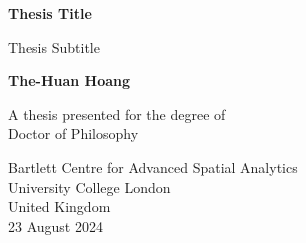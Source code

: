 \begin{titlepage}
    \begin{center}
        \vspace*{1cm}
 
        \textbf{Thesis Title}
 
        \vspace{0.5cm}
         Thesis Subtitle
             
        \vspace{1.5cm}
 
        \textbf{The-Huan Hoang}
 
        \vfill
             
        A thesis presented for the degree of\\
        Doctor of Philosophy
             
        \vspace{0.8cm}
                 
        Bartlett Centre for Advanced Spatial Analytics \\
        University College London\\
        United Kingdom\\
        23 August 2024
             
    \end{center}
 \end{titlepage}